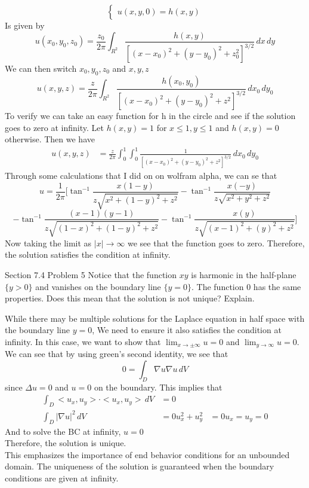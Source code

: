 \documentclass[answers,12pt,addpoints]{exam}
\begin{document}
\begin{questions}
\begin{solution}
$$\begin{cases}
            u(x,y,0) = h(x,y)
        \end{cases}$$
        Is given by 
        $$ u(x_0, y_0, z_0) = \frac{z_0}{2\pi} \int_{R^2} \frac{h(x,y)}{[(x-x_0)^2 + (y-y_0)^2 + z_0^2]^{3/2}} \, dx \, dy$$
        We can then switch $x_0, y_0, z_0$ and $x, y, z$ 
        $$ u(x, y, z) = \frac{z}{2\pi} \int_{R^2} \frac{h(x_0,y_0)}{[(x-x_0)^2 + (y-y_0)^2 + z^2]^{3/2}} \, dx_0 \, dy_0$$
        To verify we can take an easy function for h in the circle and see if the solution goes to zero at infinity. Let $h(x,y) = 1$ for $x\leq 1, y \leq 1$ and $h(x,y) = 0$ otherwise. Then we have
        \begin{align*}
            u(x, y, z) &= \frac{z}{2\pi} \int_0^1 \int_0^1 \frac{1}{[(x-x_0)^2 + (y-y_0)^2 + z^2]^{3/2}} \, dx_0 \, dy_0
        \end{align*}
        Through some calculations that I did on on wolfram alpha, we can se that
        $$ u = \frac{1}{2\pi}[\tan^{-1}\frac{x(1-y)}{z\sqrt{x^2+(1-y)^2+z^2}} - \tan^{-1}\frac{x(-y)}{z\sqrt{x^2+y^2+z^2}}$$
        $$-\tan^{-1}\frac{(x-1)(y-1)}{z\sqrt{(1-x)^2+(1-y)^2+z^2}} - \tan^{-1}\frac{x(y)}{z\sqrt{(x-1)^2+(y)^2+z^2}}] $$
        Now taking the limit as $|x| \to \infty$ we see that the function goes to zero. Therefore, the solution satisfies the condition at infinity.
    \end{solution}
    \question Section 7.4 Problem 5
    Notice that the function \(xy\) is harmonic in the half-plane \(\{y > 0\}\) and vanishes on the boundary line \(\{y = 0\}\). The function \(0\) has the same properties. Does this mean that the solution is not unique? Explain.
    \begin{solution}
        While there may be multiple solutions for the Laplace equation in half space with the boundary line $y=0$, We need to ensure it also satisfies the condition at infinity. In this case, we want to show that $\lim_{x \to \pm \infty} u = 0$ and $\lim_{y \to \infty} u = 0$. We can see that by using green's second identity, we see that 
        $$ 0 = \int_{D} \nabla u \nabla u \, dV$$
        since $\Delta u = 0$ and $u = 0$ on the boundary.
        This implies that 
        \begin{align*}
            \int_D <u_x, u_y>  \cdot <u_x, u_y> \, dV &= 0\\
            \int_D |\nabla u|^2 \, dV &= 0
            u_x^2 + u_y^2 &= 0
            u_x = u_y = 0
        \end{align*}
        And to solve the BC at infinity, $u = 0$\\
        Therefore, the solution is unique.\\
        This emphasizes the importance of end behavior conditions for an unbounded domain. The uniqueness of the solution is guaranteed when the boundary conditions are given at infinity.
    \end{solution}


\end{questions}
\end{document}
